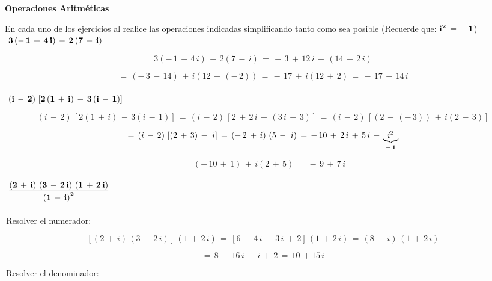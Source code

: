 \documentclass[a4paper,11pt,openany]{book}
\begin{document}
\begin{center}
\textbf{Operaciones Aritméticas}
\end{center}

En cada uno de los ejercicios  al  realice las operaciones indicadas simplificando tanto como sea posible (Recuerde que: $\bf{i^{2}\,=\,-\,1}$)\\

\textcolor{ao(english)}{}\,\quad\,$\bf{3\left(-\,1\,+\,4\,i\right)\,-\,2\left(7\,-\,i\right)}$

$$3\left(-\,1\,+\,4\,i\right)\,-\,2\left(7\,-\,i\right)\,=\,-\,3\,+\,12\,i\,-\,\left(14\,-\,2\,i\right)$$

$$=\,\left(-\,3\,-\,14\right)\,+\,i\left(12\,-\,(-\,2)\right)\,=\,-\,17\,+\,i\left(12\,+\,2\right)\,=\,-\,17\,+\,14\,i$$\\

\textcolor{ao(english)}{}\,\quad\,$\bf{\left(i\,-\,2\right)\,\left[2\left(1\,+\,i\right)\,-\,3\left(i\,-\,1\right)\right]}$

$$\left(i\,-\,2\right)\,\left[2\left(1\,+\,i\right)\,-\,3\left(i\,-\,1\right)\right]\,=\,\left(i\,-\,2\right)\,\left[2\,+\,2\,i\,-\,\left(3\,i\,-\,3\right)\right]\,=\,\left(i\,-\,2\right)\,\left[\left(2\,-\,(-\,3)\right)\,+\,i\left(2\,-\,3\right)\right]$$

$$=\,\left(i\,-\,2\right)\,\left[\left(2\,+\,3\right)\,-\,\,i\right]\,=\,\left(-\,2\,+\,i\right)\,\left(5\,-\,\,i\right)\,=\,-\,10\,+\,2\,i\,+\,5\,i\,-\,\underbrace{i^{2}}_{\bf{-\,1}}$$

$$=\,\left(-\,10\,+\,1\right)\,+\,i\left(2\,+\,5\right)\,=\,-\,9\,+\,7\,i$$\\

\textcolor{ao(english)}{}\,\quad\,$\bf{\dfrac{\left(2\,+\,i\right)\,\left(3\,-\,2\,i\right)\,\left(1\,+\,2\,i\right)}{\left(1\,-\,i\right)^{2}}}$\\
\\

\textcolor{ao(english)}{}\,Resolver el numerador:

$$\left[\left(2\,+\,i\right)\,\left(3\,-\,2\,i\right)\right]\,\left(1\,+\,2\,i\right)\,=\,\left[6\,-\,4\,i\,+\,3\,i\,+\,2\right]\,\left(1\,+\,2\,i\right)\,=\,\left(8\,-\,i\right)\,\left(1\,+\,2\,i\right)$$

$$=\,8\,+\,16\,i\,-\,i\,+\,2\,=\,10\,+15\,i$$

\textcolor{ao(english)}{}\,Resolver el denominador: 
\end{document}
